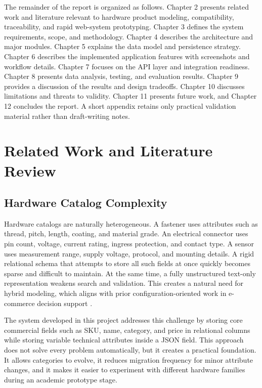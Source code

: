 \documentclass[12pt,letterpaper,oneside,openany]{book}
\begin{document}
\begin{justifying}
The remainder of the report is organized as follows. Chapter 2 presents related
work and literature relevant to hardware product modeling, compatibility,
traceability, and rapid web-system prototyping. Chapter 3 defines the system
requirements, scope, and methodology. Chapter 4 describes the architecture and
major modules. Chapter 5 explains the data model and persistence strategy.
Chapter 6 describes the implemented application features with screenshots and
workflow details. Chapter 7 focuses on the API layer and integration readiness.
Chapter 8 presents data analysis, testing, and evaluation results. Chapter 9
provides a discussion of the results and design tradeoffs. Chapter 10 discusses
limitations and threats to validity. Chapter 11 presents future work, and
Chapter 12 concludes the report. A short appendix retains only practical
validation material rather than draft-writing notes.
\end{justifying}

\chapter{Related Work and Literature Review}

\section{Hardware Catalog Complexity}

\begin{justifying}
Hardware catalogs are naturally heterogeneous. A fastener uses attributes such
as thread, pitch, length, coating, and material grade. An electrical connector
uses pin count, voltage, current rating, ingress protection, and contact type.
A sensor uses measurement range, supply voltage, protocol, and mounting
details. A rigid relational schema that attempts to store all such fields at
once quickly becomes sparse and difficult to maintain. At the same time, a
fully unstructured text-only representation weakens search and validation. This
creates a natural need for hybrid modeling, which aligns with prior
configuration-oriented work in e-commerce decision support \cite{scholz-config}.
\end{justifying}

\begin{justifying}
The system developed in this project addresses this challenge by storing core
commercial fields such as SKU, name, category, and price in relational columns
while storing variable technical attributes inside a JSON field. This approach
does not solve every problem automatically, but it creates a practical
foundation. It allows categories to evolve, it reduces migration frequency for
minor attribute changes, and it makes it easier to experiment with different
hardware families during an academic prototype stage.
\end{justifying}
\end{document}
